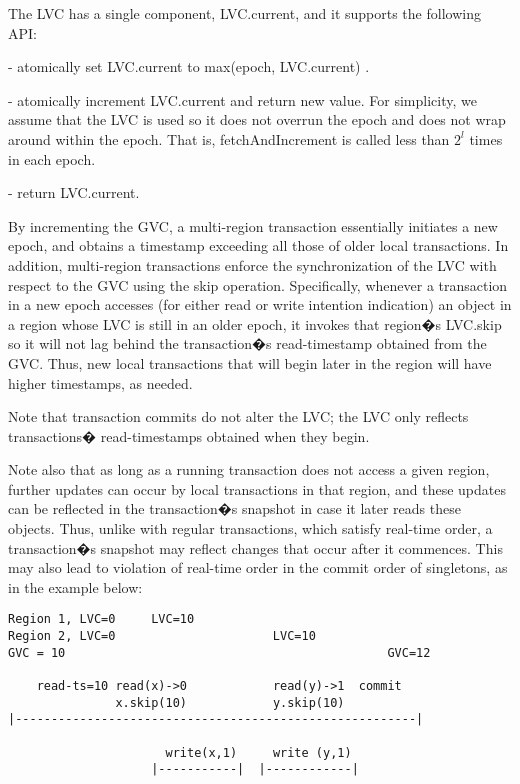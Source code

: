 The LVC has a single component, LVC.current, and it supports the following API:

 - atomically set LVC.current to max(epoch, LVC.current) .

 - atomically increment LVC.current and return new
value.
For simplicity, we assume that the LVC is used so it does not overrun the epoch
and does not wrap around within the epoch. That is, fetchAndIncrement is called
less than $2^l$ times in each epoch.

 - return LVC.current.

By incrementing the GVC, a multi-region transaction essentially initiates a new
epoch, and obtains a timestamp exceeding all those of older local transactions.
In addition, multi-region transactions enforce the synchronization of the LVC
with respect to the GVC using the skip operation. Specifically, whenever a
transaction in a new epoch accesses (for either read or write intention
indication) an object in a region whose LVC is still in an older epoch, it
invokes that region�s LVC.skip so it will not lag behind the transaction�s
read-timestamp obtained from the GVC. Thus, new local transactions that will
begin later in the region will have higher timestamps, as needed.

Note that transaction commits do not alter the LVC; the LVC only reflects
transactions� read-timestamps obtained when they  begin.

Note also that as long as a running transaction does not access a given region,
further updates can occur by local transactions in that region, and these
updates can be reflected in the transaction�s snapshot in case it later reads
these objects. Thus, unlike with regular transactions, which satisfy real-time
order, a transaction�s snapshot may reflect changes that occur after it
commences.  This may also lead to violation of real-time order in the commit
order of singletons, as in the example below:
{\scriptsize
\begin{verbatim}
Region 1, LVC=0     LVC=10
Region 2, LVC=0                      LVC=10
GVC = 10                                             GVC=12

    read-ts=10 read(x)->0            read(y)->1  commit
               x.skip(10)            y.skip(10)
|--------------------------------------------------------|

                      write(x,1)     write (y,1) 
                    |-----------|  |------------|

\end{verbatim}}

